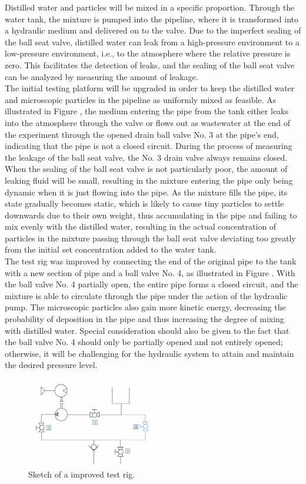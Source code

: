 Distilled water and particles will be mixed in a specific proportion. 
Through the water tank, the mixture is pumped into the pipeline, where 
it is transformed into a hydraulic medium and delivered on to the valve. 
Due to the imperfect sealing of the ball seat valve, distilled water can leak 
from a high-pressure environment to a low-pressure environment, i.e., to the 
atmosphere where the relative pressure is zero. This facilitates the detection of leaks, 
and the sealing of the ball seat valve can be analyzed by measuring the amount of leakage.\\

The initial testing platform will be upgraded in order to keep the distilled water and microscopic
 particles in the pipeline as uniformly mixed as feasible. As illustrated in Figure , 
 the medium 
 entering the pipe from the tank either leaks into the atmosphere through the valve or flows out as 
 wastewater at the end of the experiment through the opened drain ball valve No. 3 at the pipe's end, 
 indicating that the pipe is not a closed circuit. During the process of measuring the leakage of the 
 ball seat valve, the No. 3 drain valve always remains closed. When the sealing of the ball seat valve 
 is not particularly poor, the amount of leaking fluid will be small, resulting in the mixture entering 
 the pipe only being dynamic when it is just flowing into the pipe. As the mixture fills the pipe, its 
 state gradually becomes static, which is likely to cause tiny particles to settle downwards due to their
  own weight, thus accumulating in the pipe and failing to mix evenly with the distilled water, resulting 
  in the actual concentration of particles in the mixture passing through the ball seat valve 
 deviating too greatly from the initial set concentration added to the water tank.\\

 The test rig was improved by connecting the end of the original pipe to the tank with a new section of
  pipe and a ball valve No. 4, as illustrated in Figure . With the ball valve No. 4 partially open, 
  the entire pipe forms a closed circuit, and the mixture is able to circulate through the pipe under 
  the action of the hydraulic pump. The microscopic particles also gain more kinetic energy, decreasing 
  the probability of deposition in the pipe and thus increasing the degree of mixing with distilled water. 
  Special consideration should also be given to the fact that the ball valve No. 4 should only be partially 
  opened and not entirely opened; otherwise, it will be challenging for the hydraulic system 
  to attain and maintain the desired pressure level.

  \begin{figure}[htbp]
    \centering
    \includegraphics[width=0.5\textwidth]{figures/TestRig/TestRig2.jpg}
    \caption{Sketch of a improved test rig.}
    \label{fig:TestRig2}
\end{figure}